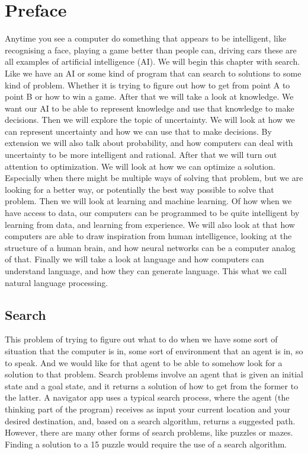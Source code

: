 \section{Preface}
Anytime you see a computer do something that appears to be intelligent, like recognising a face, playing a game better than people can, driving cars these are all examples of artificial intelligence (AI). 
We will begin this chapter with search. Like we have an AI or some kind of program that can search to solutions to some kind of problem. Whether it is trying to figure out how to get from point A to point B or how to win a game.
After that we will take a look at knowledge. We want our AI to be able to represent knowledge and use that knowledge to make decisions. 
Then we will explore the topic of uncertainty. We will look at how we can represent uncertainty and how we can use that to make decisions. By extension we will also talk about probability, and how computers can deal with uncertainty to be more intelligent and rational.
After that we will turn out attention to optimization. We will look at how we can optimize a solution. Especially when there might be multiple ways of solving that problem, but we are looking for a better way, or potentially the best way possible to solve that problem.
Then we will look at learning and machine learning. Of how when we have access to data, our computers can be programmed to be quite intelligent by learning from data, and learning from experience.
We will also look at that how computers are able to draw inspiration from human intelligence, looking at the structure of a human brain, and how neural networks can be a computer analog of that.
Finally we will take a look at language and how computers can understand language, and how they can generate language. This what we call natural language processing.

\subsection{Search}
This problem of trying to figure out what to do when we have some sort of situation that the computer is in, some sort of environment that an agent is in, so to speak. And we would like for that agent to be able to somehow look for a solution to that problem. 
Search problems involve an agent that is given an initial state and a goal state, and it returns a solution of how to get from the former to the latter. A navigator app uses a typical search process, where the agent (the thinking part of the program) receives as input your current location and your desired destination, and, based on a search algorithm, returns a suggested path. However, there are many other forms of search problems, like puzzles or mazes.
Finding a solution to a 15 puzzle would require the use of a search algorithm.
